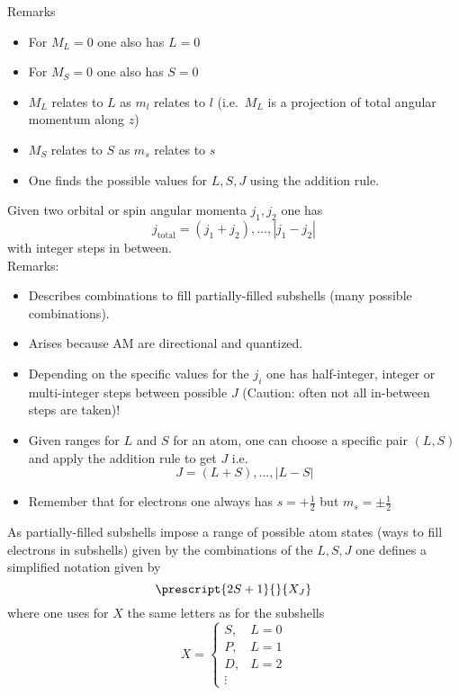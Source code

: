 Remarks
\begin{itemize}
    \item For $M_L=0$ one also has $L=0$
    \item For $M_S=0$ one also has $S=0$
    \item $M_L$ relates to $L$ as $m_l$ relates to $l$ (i.e.\ $M_L$ is a projection of total angular momentum along $z$)
    \item $M_S$ relates to $S$ as $m_s$ relates to $s$
    \item One finds the possible values for $L,S,J$ using the addition rule.
\end{itemize}


Given two orbital or spin angular momenta $j_1, j_2$ one has
\begin{equation*}
    j_{\mathrm{total}}=(j_1+j_2),\dots,|j_1-j_2|
\end{equation*}
with integer steps in between.\\ 
Remarks:
\begin{itemize}
    \item Describes combinations to fill partially-filled subshells (many possible combinations).
    \item Arises because AM are directional and quantized.
    \item Depending on the specific values for the $j_i$ one has half-integer, integer or multi-integer steps between possible $J$ (Caution: often not all in-between steps are taken)!
    \item Given ranges for $L$ and $S$ for an atom, one can choose a specific pair $(L,S)$ and apply the addition rule to get $J$ i.e.
          \begin{equation*}
              J=(L+S),\dots,|L-S|
          \end{equation*}
    \item Remember that for electrons one always has $s=+\frac{1}{2}$ but $m_s=\pm \frac{1}{2}$
\end{itemize}


As partially-filled subshells impose a range of possible atom states (ways to fill electrons in subshells) given by the combinations of the $L,S,J$ one defines a simplified notation given by
\begin{equation*}
    \prescript{2S+1}{}{X_J}
\end{equation*}
where one uses for $X$ the same letters as for the subshells
\begin{equation*}
    X=
    \begin{cases}
        S,     & L=0 \\
        P,     & L=1 \\
        D,     & L=2 \\
        \vdots &
    \end{cases}
\end{equation*}

